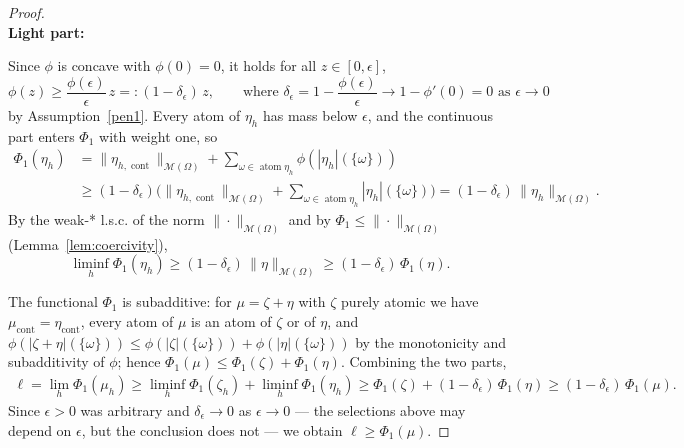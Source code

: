 \documentclass[11pt]{amsart}
\theoremstyle{definition}
\theoremstyle{remark}
\DeclareMathOperator{\atom}{atom}
\DeclareMathOperator{\cont}{cont}
\begin{document}
\begin{proof}
	\quad\\
	\textbf{Light part:} \par
	Since $\phi$ is concave with $\phi(0) = 0$, it holds for all $z \in [0, \epsilon]$,
	\begin{equation*}
			\phi(z) \ge \frac{\phi(\epsilon)}{\epsilon}\, z =: (1 - \delta_\epsilon)\, z,
			\qquad \text{where } \delta_\epsilon = 1 - \frac{\phi(\epsilon)}{\epsilon} \rightarrow 1 - \phi'(0) = 0 \text{ as } \epsilon \rightarrow 0
	\end{equation*}
	by Assumption~\ref{pen1}.
	Every atom of $\eta_h$ has mass below $\epsilon$, and the continuous part enters $\Phi_1$ with weight one, so
	\begin{equation*}
	\begin{aligned}
		\Phi_1(\eta_h)
		&= \|\eta_{h, \cont}\|_{\mathcal{M}(\Omega)} + \sum_{\omega \in \atom \eta_h} \phi(|\eta_{h}|(\{\omega\}))\\
		&\ge (1 - \delta_\epsilon) \bigg( \|\eta_{h, \cont}\|_{\mathcal{M}(\Omega)} + \sum_{\omega \in \atom \eta_h} |\eta_{h}|(\{\omega\}) \bigg)
		= (1 - \delta_\epsilon)\, \|\eta_h\|_{\mathcal{M}(\Omega)}.
	\end{aligned}
	\end{equation*}
	By the weak-* l.s.c. of the norm $\|\cdot\|_{\mathcal{M}(\Omega)}$ and by $\Phi_1 \le \|\cdot\|_{\mathcal{M}(\Omega)}$ (Lemma~\ref{lem:coercivity}),
	\begin{equation*}
		\liminf_h \Phi_1(\eta_h) \ge (1 - \delta_\epsilon)\, \|\eta\|_{\mathcal{M}(\Omega)} \ge (1 - \delta_\epsilon)\, \Phi_1(\eta).
	\end{equation*}

	The functional $\Phi_1$ is subadditive: for $\mu = \zeta + \eta$ with $\zeta$ purely atomic we have $\mu_{\cont} = \eta_{\cont}$, every atom of $\mu$ is an atom of $\zeta$ or of $\eta$, and $\phi(|\zeta + \eta|(\{\omega\})) \le \phi(|\zeta|(\{\omega\})) + \phi(|\eta|(\{\omega\}))$ by the monotonicity and subadditivity of $\phi$; hence $\Phi_1(\mu) \le \Phi_1(\zeta) + \Phi_1(\eta)$. Combining the two parts,
	\begin{align*}
		\ell = \lim_h \Phi_1(\mu_h)
		\ge \liminf_h \Phi_1(\zeta_h) + \liminf_h \Phi_1(\eta_h)
		\ge \Phi_1(\zeta) + (1 - \delta_\epsilon)\, \Phi_1(\eta)
		\ge (1 - \delta_\epsilon)\, \Phi_1(\mu).
	\end{align*}
	Since $\epsilon > 0$ was arbitrary and $\delta_\epsilon \rightarrow 0$ as $\epsilon \rightarrow 0$ --- the selections above may depend on $\epsilon$, but the conclusion does not --- we obtain $\ell \ge \Phi_1(\mu)$.
\end{proof}
\end{document}
